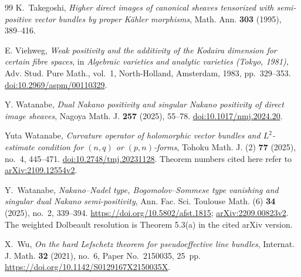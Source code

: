 \documentclass[11pt,reqno]{amsart}
\numberwithin{equation}{section}
\theoremstyle{definition}
\theoremstyle{remark}
\begin{document}
\begin{thebibliography}{99}
K.~Takegoshi,
\emph{Higher direct images of canonical sheaves tensorized with
semi-positive vector bundles by proper K\"ahler morphisms},
Math. Ann. \textbf{303} (1995), 389--416.

E. Viehweg, \emph{Weak positivity and the additivity of the Kodaira dimension for certain fibre spaces}, in \emph{Algebraic varieties and analytic varieties (Tokyo, 1981)}, Adv. Stud. Pure Math., vol.~1, North-Holland, Amsterdam, 1983, pp.~329--353. \href{https://doi.org/10.2969/aspm/00110329}{doi:10.2969/aspm/00110329}.

Y. Watanabe, \emph{Dual Nakano positivity and singular Nakano positivity of direct image sheaves}, Nagoya Math. J. \textbf{257} (2025), 55--78. \href{https://doi.org/10.1017/nmj.2024.20}{doi:10.1017/nmj.2024.20}.

Yuta Watanabe, \emph{Curvature operator of holomorphic vector bundles and $L^2$-estimate condition for $(n,q)$ or $(p,n)$-forms}, Tohoku Math. J. (2) \textbf{77} (2025), no.~4, 445--471. \href{https://doi.org/10.2748/tmj.20231128}{doi:10.2748/tmj.20231128}. Theorem numbers cited here refer to \href{https://arxiv.org/abs/2109.12554v2}{arXiv:2109.12554v2}.

Y.~Watanabe,
\emph{Nakano--Nadel type, Bogomolov--Sommese type vanishing and
singular dual Nakano semi-positivity},
Ann. Fac. Sci. Toulouse Math. (6) \textbf{34} (2025), no.~2, 339--394.
\url{https://doi.org/10.5802/afst.1815};
\href{https://arxiv.org/abs/2209.00823v2}{arXiv:2209.00823v2}.
The weighted Dolbeault resolution is Theorem 5.3(a) in the cited
arXiv version.

X.~Wu,
\emph{On the hard Lefschetz theorem for pseudoeffective line bundles},
Internat. J. Math. \textbf{32} (2021), no.~6, Paper No.~2150035, 25~pp.
\url{https://doi.org/10.1142/S0129167X2150035X}.
\end{thebibliography}
\end{document}
